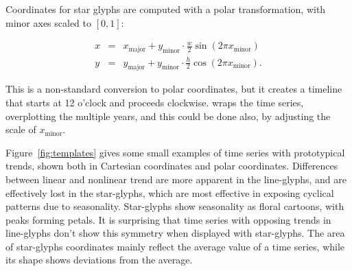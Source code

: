 \documentclass[oneside]{article}
\newcommand\amin{\text{minor}}
\newcommand\amaj{\text{major}}
\begin{document}

Coordinates for star glyphs are computed with a polar transformation, with minor axes scaled to $[0, 1]$: 

\begin{equation}
  \begin{array}{lll}
  x &=& x_{\amaj} + y_{\amin} \cdot \frac{w}{2} \sin(2 \pi x_{\amin}) \\
  y &=& y_{\amaj} + y_{\amin} \cdot \frac{h}{2} \cos(2 \pi x_{\amin}).
  \end{array}
  \label{coords.polar.eqn}
\end{equation}

\noindent This is a non-standard conversion to polar coordinates, but it creates a timeline that starts at 12 o'clock and proceeds clockwise. \citet{eden:2010} wraps the time series, overplotting the multiple years, and this could be done also, by adjusting the scale of $x_{\amin}$. 

%
% 
% 
%     
%   

Figure~\ref{fig:templates} gives some small examples of time series with prototypical trends, shown both in Cartesian coordinates and polar coordinates. Differences between linear and nonlinear trend are more apparent in the line-glyphs, and are effectively lost in the star-glyphs, which are most effective in exposing cyclical patterns due to seasonality. Star-glyphs show seasonality as floral cartoons, with peaks forming petals. It is surprising that time series with opposing trends in line-glyphs don't show this symmetry when displayed with star-glyphs. The area of star-glyphs coordinates mainly reflect the average value of a time series, while its shape shows deviations from the average.
\end{document}
